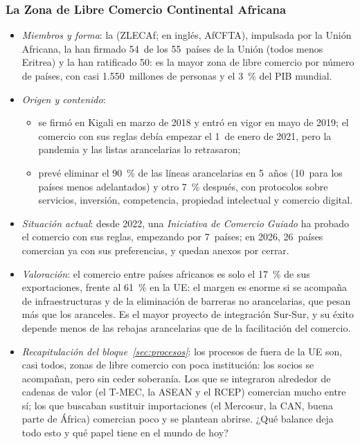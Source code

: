 \documentclass[11pt]{article}
\begin{document}
\subsubsection{La Zona de Libre Comercio Continental Africana}\label{sec:zlecaf}

\begin{itemize}
\item \emph{Miembros y forma}: la  (ZLECAf; en inglés, AfCFTA), impulsada por la Unión Africana, la han firmado 54~de los 55~países de la Unión (todos menos Eritrea) y la han ratificado 50: es la mayor zona de libre comercio por número de países, con casi 1.550~millones de personas y el 3~\% del PIB mundial\nocite{AfCFTA2026Consejo,BM2026WDI}.
\item \emph{Origen y contenido}:
  \begin{itemize}
  \item se firmó en Kigali en marzo de 2018 y entró en vigor en mayo de 2019; el comercio con sus reglas debía empezar el 1~de enero de 2021, pero la pandemia y las listas arancelarias lo retrasaron;
  \item prevé eliminar el 90~\% de las líneas arancelarias en 5~años (10~para los países menos adelantados) y otro 7~\% después, con protocolos sobre servicios, inversión, competencia, propiedad intelectual y comercio digital.
  \end{itemize}
\item \emph{Situación actual}: desde 2022, una \emph{Iniciativa de Comercio Guiado} ha probado el comercio con sus reglas, empezando por 7~países; en 2026, 26~países comercian ya con sus preferencias, y quedan anexos por cerrar\nocite{AfCFTA2026Consejo}.
\item \emph{Valoración}: el comercio entre países africanos es solo el 17~\% de sus exportaciones, frente al 61~\% en la UE: el margen es enorme si se acompaña de infraestructuras y de la eliminación de barreras no arancelarias, que pesan más que los aranceles. Es el mayor proyecto de integración Sur-Sur, y su éxito depende menos de las rebajas arancelarias que de la facilitación del comercio.
\end{itemize}

\begin{itemize}
\item \emph{Recapitulación del bloque~\ref{sec:procesos}}: los procesos de fuera de la UE son, casi todos, zonas de libre comercio con poca institución: los socios se acompañan, pero sin ceder soberanía. Los que se integraron alrededor de cadenas de valor (el T-MEC, la ASEAN y el RCEP) comercian mucho entre sí; los que buscaban sustituir importaciones (el Mercosur, la CAN, buena parte de África) comercian poco y se plantean abrirse. ¿Qué balance deja todo esto y qué papel tiene en el mundo de hoy?
\end{itemize}
\end{document}
